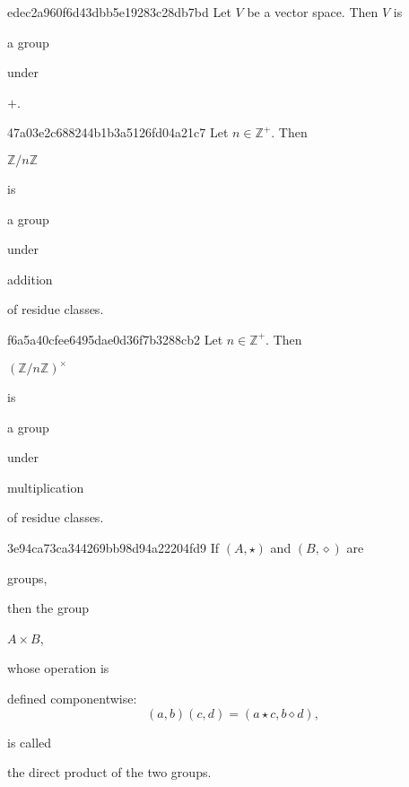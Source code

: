 \begin{note}{edec2a960f6d43dbb5e19283c28db7bd}
    Let \({ V }\) be a vector space. Then \({ V }\) is \begin{icloze}{2}a group\end{icloze} under \begin{icloze}{1}\({ + }\).\end{icloze}
\end{note}

\begin{note}{47a03e2c688244b1b3a5126fd04a21c7}
    Let \({ n \in \mathbb Z^{+} }\). Then \begin{icloze}{3}\({ \mathbb Z / n\mathbb Z }\)\end{icloze} is \begin{icloze}{2}a group\end{icloze} under \begin{icloze}{1}addition\end{icloze} of residue classes.
\end{note}

\begin{note}{f6a5a40cfee6495dae0d36f7b3288cb2}
    Let \({ n \in \mathbb Z^{+} }\). Then \begin{icloze}{3}\({ \left( \mathbb Z / n\mathbb Z \right)^{\times} }\)\end{icloze} is \begin{icloze}{2}a group\end{icloze} under \begin{icloze}{1}multiplication\end{icloze} of residue classes.
\end{note}

\begin{note}{3e94ca73ca344269bb98d94a22204fd9}
    If \({ (A, \star) }\) and \({ (B, \diamond) }\) are \begin{icloze}{4}groups,\end{icloze} then the group \begin{icloze}{2}\({ A \times B }\),\end{icloze} whose operation is
    \begin{icloze}{1}
        defined componentwise:
        \[
            (a, b)(c, d) = (a \star c, b \diamond d),
        \]
    \end{icloze}
    is called \begin{icloze}{3}the direct product of the two groups.\end{icloze}
\end{note}

